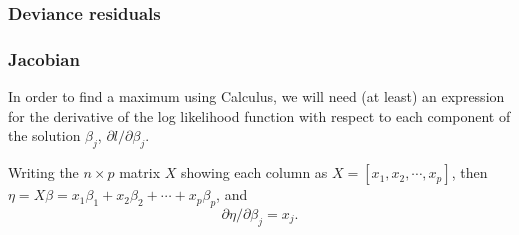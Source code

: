\documentclass[10pt]{article} %
\begin{document}
\subsubsection*{Deviance residuals}



\subsubsection*{Jacobian}

In order to find a maximum using Calculus, we will need (at least) an
expression for the derivative of the log likelihood function with respect to
each component of the solution $\beta_j$, $\partial{l}/\partial{\beta_j}$.

Writing the $n \times p$ matrix $X$ showing each column as
$X = [x_1, x_2, \cdots, x_p]$, then
$\eta = X\beta = x_1\beta_1 + x_2\beta_2 + \cdots + x_p\beta_p$,
and 
\begin{equation}\label{eta}
\partial\eta/\partial\beta_j = x_j.
\end{equation}
\end{document}
